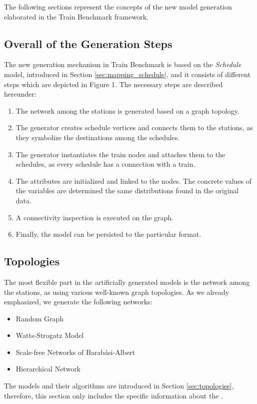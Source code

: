 The following sections represent the concepts of the new model generation elaborated in the Train Benchmark framework.

\subsection{Overall of the Generation Steps}
The new generation mechanism in Train Benchmark is based on the \textit{Schedule} model, introduced in Section \ref{sec:mapping_schedule}, and it consists of different steps which are depicted in Figure 1. %
The necessary steps are described hereunder:
\begin{enumerate}
	\item The network among the stations is generated based on a graph topology.
	\item The generator creates schedule vertices and connects them to the stations, as they symbolize the destinations among the schedules.
	\item The generator instantiates the train nodes and attaches them to the schedules, as every schedule has a connection with a train.
	\item The attributes are initialized and linked to the nodes. The concrete values of the variables are determined the same distributions found in the original data.
	\item A connectivity inspection is executed on the graph.
	\item Finally, the model can be persisted to the particular format. %
\end{enumerate}

\subsection{Topologies}
The most flexible part in the artificially generated models is the network among the stations, as using various well-known graph topologies. As we already emphasized, we generate the following networks:
\begin{itemize}
	\item Random Graph
	\item Watts-Strogatz Model
	\item Scale-free Networks of Barabási-Albert
	\item Hierarchical Network
\end{itemize}
The models and their algorithms are introduced in Section \ref{sec:topologies}, therefore, this section only includes the specific information about the .

